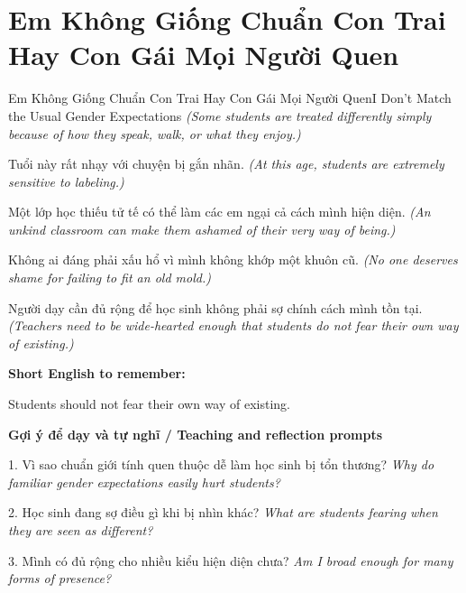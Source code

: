 \section{Em Không Giống Chuẩn Con Trai Hay Con Gái Mọi Người Quen}
\begin{truyen}{Em Không Giống Chuẩn Con Trai Hay Con Gái Mọi Người Quen}{I Don't Match the Usual Gender Expectations}
\textit{(Some students are treated differently simply because of how they speak, walk, or what they enjoy.)}

Tuổi này rất nhạy với chuyện bị gắn nhãn.
\textit{(At this age, students are extremely sensitive to labeling.)}

Một lớp học thiếu tử tế có thể làm các em ngại cả cách mình hiện diện.
\textit{(An unkind classroom can make them ashamed of their very way of being.)}

Không ai đáng phải xấu hổ vì mình không khớp một khuôn cũ.
\textit{(No one deserves shame for failing to fit an old mold.)}

\end{truyen}

\begin{baihoc}
Người dạy cần đủ rộng để học sinh không phải sợ chính cách mình tồn tại.
\textit{(Teachers need to be wide-hearted enough that students do not fear their own way of existing.)}
\end{baihoc}

\begin{ghinhoanh}
\textbf{Short English to remember:}

Students should not fear their own way of existing.

\end{ghinhoanh}

\begin{tuhocnhanh}
\textbf{Gợi ý để dạy và tự nghĩ / Teaching and reflection prompts}

1. Vì sao chuẩn giới tính quen thuộc dễ làm học sinh bị tổn thương? \textit{Why do familiar gender expectations easily hurt students?}

2. Học sinh đang sợ điều gì khi bị nhìn khác? \textit{What are students fearing when they are seen as different?}

3. Mình có đủ rộng cho nhiều kiểu hiện diện chưa? \textit{Am I broad enough for many forms of presence?}
\end{tuhocnhanh}
\ngancach

